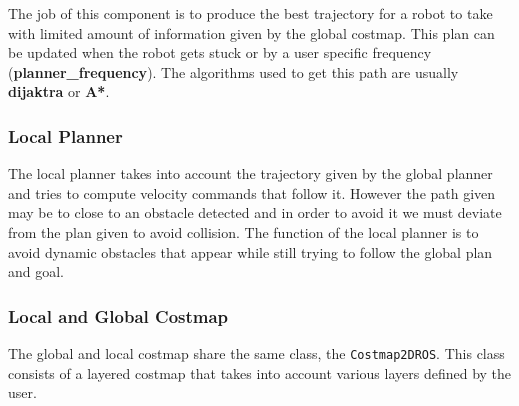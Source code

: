 \documentclass[12pt]{article}
\begin{document}
The job of this component is to produce the best trajectory for a robot to take with limited amount of information given by the global costmap.
This plan can be updated when the robot gets stuck or by a user specific frequency (\textbf{planner\_frequency}). The algorithms used to get this path are usually \textbf{dijaktra} or \textbf{A*}.

\subsubsection{Local Planner}
The local planner takes into account the trajectory given by the global planner and tries to compute velocity commands that follow it. However the path given may be to close to an obstacle detected and in order to avoid it we must deviate from the plan given to avoid collision. The function of the local planner is to avoid dynamic obstacles that appear while still trying to follow the global plan and goal. 

\subsubsection{Local and Global Costmap}
The global and local costmap share the same class, the  \texttt{Costmap2DROS}. This class consists of a layered costmap that takes into account various layers defined by the user.
\end{document}
